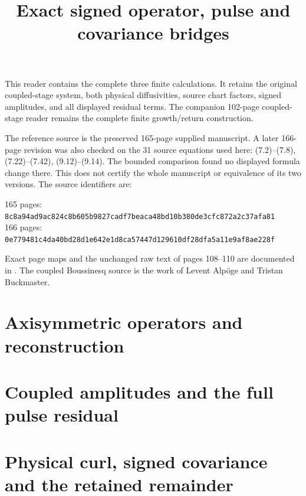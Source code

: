 \documentclass[11pt]{article}
\title{Exact signed operator, pulse and covariance bridges}
\author{}\date{}
\begin{document}
\maketitle
This reader contains the complete three finite calculations. It retains
the original coupled-stage system, both physical diffusivities, source
chart factors, signed amplitudes, and all displayed residual terms.
The companion 102-page coupled-stage reader remains the complete finite
growth/return construction.

The reference source is the preserved 165-page supplied manuscript.
A later 166-page revision was also checked on the 31 source equations
used here: (7.2)--(7.8), (7.22)--(7.42), (9.12)--(9.14).
The bounded comparison found no displayed formula change there.
This does not certify the whole manuscript or equivalence of its two versions.
The source identifiers are:
\begin{center}\footnotesize
165 pages: \texttt{8c8a94ad9ac824c8b605b9827cadf7beaca48bd10b380de3cfc872a2c37afa81}\\
166 pages: \texttt{0e779481c4da40bd28d1e642e1d8ca57447d129610df28dfa5a11e9af8ae228f}
\end{center}
Exact page maps and the unchanged raw text of pages 108--110 are
documented in .
The coupled Boussinesq source is the work of Levent Alp\"oge and
Tristan Buckmaster.
\tableofcontents
\clearpage
\part{Axisymmetric operators and reconstruction}
\clearpage\part{Coupled amplitudes and the full pulse residual}
\clearpage\part{Physical curl, signed covariance and the retained remainder}
\end{document}
